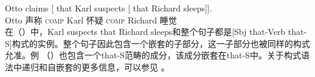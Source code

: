 
\ea
\gll Otto claims [ that Karl suspects [ that Richard sleeps]].\\
	Otto 声称 {} \textsc{comp} Karl 怀疑 {} \textsc{comp} Richard 睡觉\\
\z
在（）中，Karl suspects that Richard sleeps和整个句子都是[Sbj that-Verb that-S]构式的实例。整个句子因此包含一个嵌套的子部分，这一子部分也被同样的构式允准。例 （）也包含一个that-S范畴的成分，该成分嵌套在that-S中。关于构式语法中递归和自嵌套的更多信息，可以参见 。

